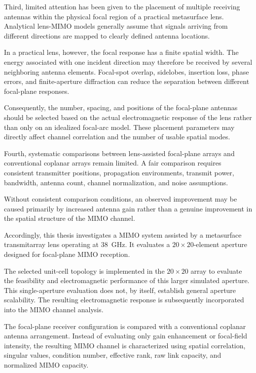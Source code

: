 Third, limited attention has been given to the placement of multiple
receiving antennas within the physical focal region of a practical
metasurface lens. Analytical lens-MIMO models generally assume that
signals arriving from different directions are mapped to clearly
defined antenna locations.

In a practical lens, however, the focal response has a finite spatial
width. The energy associated with one incident direction may therefore
be received by several neighboring antenna elements. Focal-spot
overlap, sidelobes, insertion loss, phase errors, and finite-aperture
diffraction can reduce the separation between different focal-plane
responses.

Consequently, the number, spacing, and positions of the focal-plane
antennas should be selected based on the actual electromagnetic
response of the lens rather than only on an idealized focal-arc
model. These placement parameters may directly affect channel
correlation and the number of usable spatial modes.

Fourth, systematic comparisons between lens-assisted focal-plane
arrays and conventional coplanar arrays remain limited. A fair
comparison requires consistent transmitter positions, propagation
environments, transmit power, bandwidth, antenna count, channel
normalization, and noise assumptions.

Without consistent comparison conditions, an observed improvement may
be caused primarily by increased antenna gain rather than a genuine
improvement in the spatial structure of the MIMO channel.

Accordingly, this thesis investigates a MIMO system assisted by a
metasurface transmitarray lens operating at 38~GHz. It evaluates a
$20\times20$-element aperture designed for focal-plane MIMO reception.

The selected unit-cell topology is implemented in the $20\times20$
array to evaluate the feasibility and electromagnetic performance of
this larger simulated aperture. This single-aperture evaluation does
not, by itself, establish general aperture scalability. The resulting
electromagnetic response is subsequently incorporated into the MIMO
channel analysis.

The focal-plane receiver configuration is compared with a
conventional coplanar antenna arrangement. Instead of evaluating only
gain enhancement or focal-field intensity, the resulting MIMO channel
is characterized using spatial correlation, singular values,
condition number, effective rank, raw link capacity, and normalized
MIMO capacity.

